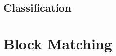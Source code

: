 \documentclass[11pt]{article}
\begin{document}

\subsection{Classification}

\section{Block Matching}
\end{document}
